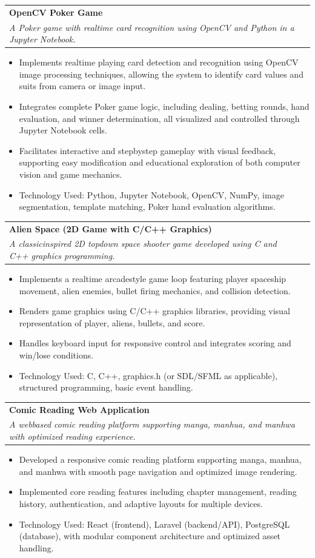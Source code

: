 \documentclass[a4paper,11pt]{article}
\makeatletter
\newcommand{\resumeProject}[4]{
\vspace{0.5mm}\item
    \begin{tabular*}{0.98\textwidth}[t]{l@{\extracolsep{\fill}}r}
        \textbf{#1} & \textit{\footnotesize{#3}} \\
        \footnotesize{\textit{#2}} & \footnotesize{#4}
    \end{tabular*}
    \vspace{-2.4mm}
    \par
}
\newcommand{\resumeItemListStart}{\begin{justify}\begin{itemize}[leftmargin=3ex, rightmargin=2ex, noitemsep,labelsep=1.2mm,itemsep=0mm]\small}
\newcommand{\resumeItemListEnd}{\end{itemize}\end{justify}\vspace{-2mm}}
\makeatother
\begin{document}
\resumeProject
{OpenCV Poker Game} %
{A Poker game with real\-time card recognition using OpenCV and Python in a Jupyter Notebook.} %
{} %
{}
\resumeItemListStart
\item {Implements real\-time playing card detection and recognition using OpenCV image processing techniques, allowing the system to identify card values and suits from camera or image input.}
\item {Integrates complete Poker game logic, including dealing, betting rounds, hand evaluation, and winner determination, all visualized and controlled through Jupyter Notebook cells.}
\item {Facilitates interactive and step\-by\-step gameplay with visual feedback, supporting easy modification and educational exploration of both computer vision and game mechanics.}
\item {Technology Used: Python, Jupyter Notebook, OpenCV, NumPy, image segmentation, template matching, Poker hand evaluation algorithms.}
\resumeItemListEnd

\clearpage
\resumeProject
{Alien Space (2D Game with C/C++ Graphics)} %
{A classic\-inspired 2D top\-down space shooter game developed using C and C++ graphics programming.} %
{} %
{}
\resumeItemListStart
\item {Implements a real\-time arcade\-style game loop featuring player spaceship movement, alien enemies, bullet firing mechanics, and collision detection.}
\item {Renders game graphics using C/C++ graphics libraries, providing visual representation of player, aliens, bullets, and score.}
\item {Handles keyboard input for responsive control and integrates scoring and win/lose conditions.}
\item {Technology Used: C, C++, graphics.h (or SDL/SFML as applicable), structured programming, basic event handling.}
\resumeItemListEnd
\vspace{-2mm}


\resumeProject
{Comic Reading Web Application} %
{A web\-based comic reading platform supporting manga, manhua, and manhwa with optimized reading experience.} %
{} %
{}
\resumeItemListStart
\item {Developed a responsive comic reading platform supporting manga, manhua, and manhwa with smooth page navigation and optimized image rendering.}
\item {Implemented core reading features including chapter management, reading history, authentication, and adaptive layouts for multiple devices.}
\item {Technology Used: React (frontend), Laravel (backend/API), PostgreSQL (database), with modular component architecture and optimized asset handling.}
\resumeItemListEnd
\vspace{-2mm}
\end{document}
